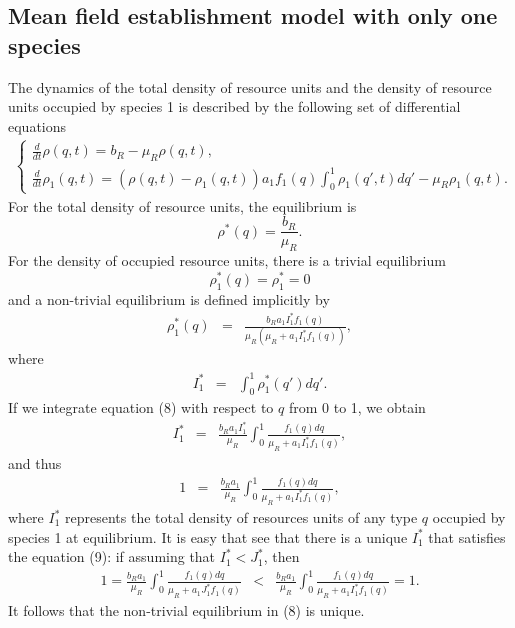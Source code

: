 \documentclass[8pt,a4paper]{article}
\begin{document}
\subsection{Mean field  establishment model with only one species}
The dynamics of the total density of resource units and the density of resource units occupied by species 1 is described by the following set of differential equations
\begin{eqnarray}
\begin{cases}
\frac{\displaystyle{d}}{\displaystyle{dt}}\rho(q,t)= b_R-\mu_R \rho(q,t),\\
\frac{\displaystyle{d}}{\displaystyle{dt}}\rho_1(q,t)= (\rho(q,t)-\rho_1(q,t)) a_1  f_1(q)\displaystyle{\int_0^1} \rho_1(q',t) dq'-\mu_R \rho_1(q,t).
\end{cases}
\end{eqnarray}
For the total density of resource units, the equilibrium is $$\rho^*(q)=\frac{b_R}{\mu_R}.$$
For the density of occupied resource units, there is a trivial equilibrium 
$$\rho_1^*(q)=\rho_1^*=0$$
and a non-trivial equilibrium is  defined implicitly by
\begin{eqnarray}
\rho_1^*(q)&=& \frac{b_R a_1 I_1^*f_1(q)}{\mu_R (\mu_R + a_1 I_1^* f_1(q))},
\end{eqnarray}
where
\begin{eqnarray*}
I_1^* &=& \int_0^1 \rho_1^*(q') dq'.
\end{eqnarray*}
If we integrate equation (8) with respect to $q$ from 0 to 1, we obtain
\begin{eqnarray*}
I_1^* &=& \frac{b_R a_1 I_1^*}{\mu_R}\int_0^1 \frac{f_1(q)dq}{\mu_R+ a_1 I_1^* f_1(q)}, 
\end{eqnarray*} 
and thus
\begin{eqnarray}
1 &=& \frac{b_R a_1}{\mu_R} \int_0^1 \frac{f_1(q)dq}{\mu_R+ a_1 I_1^* f_1(q)},
\end{eqnarray} 
where $I_1^*$ represents the total density of resources units of any type $q$ occupied by species 1 at equilibrium. It is easy that see that there is a unique $I_1^*$ that satisfies the equation (9): if assuming that $I_1^*<J_1^*$, then 
\begin{eqnarray*}
1 = \frac{b_R a_1}{\mu_R} \int_0^1 \frac{f_1(q)dq}{\mu_R+ a_1 J_1^* f_1(q)} & < & \frac{b_R a_1}{\mu_R} \int_0^1 \frac{f_1(q)dq}{\mu_R+ a_1 I_1^* f_1(q)}=1.
\end{eqnarray*}
It follows that the non-trivial equilibrium in (8) is unique.
\end{document}
